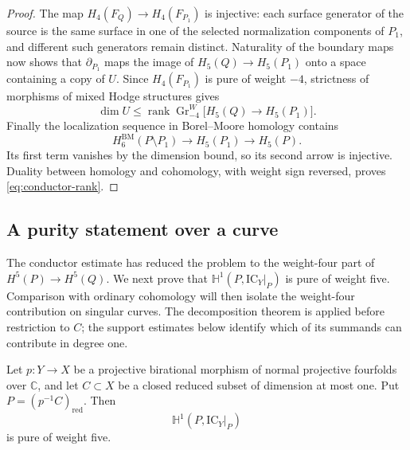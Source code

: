 \begin{proof}
The map $H_4(F_Q)\to H_4(F_{P_1})$ is injective: each surface
generator of the source is the same surface in one of the selected
normalization components of $P_1$, and different such generators
remain distinct.  Naturality of the boundary maps now shows that
$\partial_{P_1}$ maps the image of $H_5(Q)\to H_5(P_1)$ onto a
space containing a copy of $U$.  Since $H_4(F_{P_1})$ is pure of
weight $-4$, strictness of morphisms of mixed Hodge structures
\cite[Th\'eor\`eme~2.3.5(iii)]{Deligne1971} gives
\[
 \dim U\leq
 \operatorname{rank}\operatorname{Gr}^{W}_{-4}
          \bigl[H_5(Q)\longrightarrow H_5(P_1)\bigr].
\]
Finally the localization sequence in Borel--Moore homology contains
\[
 H^{\mathrm{BM}}_6(P\setminus P_1)
 \longrightarrow H_5(P_1)\longrightarrow H_5(P).
\]
Its first term vanishes by the dimension bound, so its second arrow
is injective.  Duality between homology and cohomology, with weight
sign reversed, proves \eqref{eq:conductor-rank}.
\end{proof}

\subsection{A purity statement over a curve}

The conductor estimate has reduced the problem to the weight-four
part of $H^5(P)\to H^5(Q)$.  We next prove that
$\mathbb H^1(P,\mathrm{IC}_Y|_P)$ is pure of weight five.  Comparison
with ordinary cohomology will then isolate the weight-four contribution
on singular curves.  The decomposition theorem is applied before
restriction to $C$;
the support estimates below identify which of its summands can
contribute in degree one.

\begin{lemma}\label{lem:restriction-purity}
Let $p\colon Y\to X$ be a projective birational morphism of normal
projective fourfolds over $\mathbb C$, and let $C\subset X$ be a
closed reduced subset of dimension at most one.  Put
$P=(p^{-1}C)_{\mathrm{red}}$.  Then
\[
 \mathbb H^1(P,\mathrm{IC}_Y|_P)
\]
is pure of weight five.
\end{lemma}

